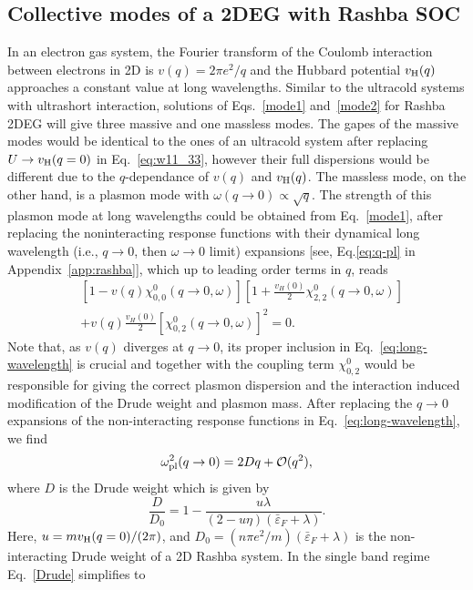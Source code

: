 \documentclass[aps, pra, reprint,superscriptaddress]{revtex4-1}
\def\be{\begin{equation}}
\def\ee{\end{equation}}
\begin{document}
\subsection{Collective modes of a 2DEG with Rashba SOC}
In an electron gas system, the Fourier transform of the Coulomb interaction between electrons in 2D is $v(q)=2\pi e^2/q$ and the Hubbard potential $v_{\rm H}(q)$ approaches a constant value at long wavelengths. Similar to the ultracold systems with ultrashort interaction, solutions of Eqs.~\eqref{mode1} and~\eqref{mode2} for Rashba 2DEG will give three massive and one massless modes. The gapes of the massive modes would be identical to the ones of an ultracold system after replacing $U \rightarrow v_{\rm H}(q=0)$ in Eq.~\eqref{eq:w11_33}, however their full dispersions would be different due to the $q$-dependance of $v(q)$ and $v_{\rm H}(q)$. 
The massless mode, on the other hand, is a plasmon mode with $\omega(q\to 0) \propto \sqrt{q}$.
The strength of this plasmon mode at long wavelengths could be obtained from Eq.~\eqref{mode1}, after replacing the noninteracting response functions with their dynamical long wavelength (i.e., $q\to 0$, then $\omega\to 0$ limit) expansions [see, Eq.\eqref{eq:q-pl} in Appendix~\ref{app:rashba}], which up to leading order terms in $q$, reads
\be\label{eq:long-wavelength}
\begin{split}
&\left[1-v(q)\chi^{0}_{0,0}(q\to 0,\omega)\right]\left[1+\frac{v_{H}(0)}{2}\chi^{0}_{2,2}(q\to 0,\omega)\right]
\\
&+v(q)\frac{v_{H}(0)}{2}\left[\chi^{0}_{0,2}({q\to 0,\omega})\right]^2 =0.
\end{split}
\ee
Note that, as $v(q)$ diverges at $q\to 0$, its proper inclusion in Eq.~\eqref{eq:long-wavelength} is crucial and together with the coupling term $\chi^0_{0,2}$ would be responsible for giving the correct plasmon dispersion and the interaction induced modification of the Drude weight and plasmon mass.
After replacing the $q\to 0$ expansions of the non-interacting response functions in Eq.~\eqref{eq:long-wavelength}, we find
\be
\omega^2_{\rm pl}(q \to 0)= 2 D q +{\cal O}(q^2),
\ee
where $D$ is the Drude weight which is given by 
\begin{equation}\label{Drude}
 \frac{D}{D_{0}}= 1- \frac{u\lambda}{(2-{u}\eta)( \bar{\varepsilon}_F+\lambda)} .
\end{equation} 
Here, $u=m v_{\rm H}(q=0)/(2\pi)$, and $D_0=(n \pi e^2/m)(\bar{\varepsilon}_F+\lambda)$ is the non-interacting Drude weight of a 2D Rashba system. In the single band regime Eq.~\eqref{Drude} simplifies to
\end{document}
